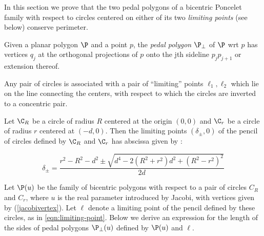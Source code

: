 In this section we prove that the two pedal polygons of a bicentric Poncelet family with respect to circles centered on either of its two {\em limiting points} (see below) conserve perimeter.

\begin{definition}
Given a planar polygon $\P$ and a point $p$, the {\em pedal polygon} $\P_{\perp}$ of $\P$ wrt $p$ has vertices $q_{j}$ at the orthogonal projections of $p$ onto the jth sideline $p_{j}p_{j+1}$ or extension thereof.
\end{definition}

\begin{definition}
Any pair of circles is associated with a pair of ``limiting'' points $\ell_1,\ell_2$ which lie on the line connecting the centers, with respect to which the circles are inverted to a concentric pair.
\end{definition}

Let $\C_{R}$ be a circle of radius $R$ centered at the origin $(0,0)$ and $\C_{r}$ be a circle of radius $r$ centered at $(-d,0)$. Then the limiting points $(\delta_{\pm},0)$ of the pencil of circles defined by $\C_{R}$ and $\C_{r}$ has abscissa given by \cite[Limiting Point, Eqn. 5]{mw}:

\begin{equation}
\delta_{\pm}=\frac{r^2-R^2-d^2 \pm %
\sqrt{d^4 -2(R^2 +r^2)d^2 + (R^2 - r^2)^2 }}{2d}
\label{eqn:limiting-point}
\end{equation}

Let $\P(u)$ be the family of bicentric polygons with respect to a pair of circles $C_{R}$ and $C_{r}$, where $u$ is the real parameter introduced by Jacobi, with vertices given by (\ref{jacobivertex}). Let $\ell$ denote a limiting point of the pencil defined by these circles, as in \eqref{eqn:limiting-point}. Below we derive an expression for the length of the sides of pedal polygons  $\P_{\perp}(u)$ defined by $\P(u)$ and $\ell$.

